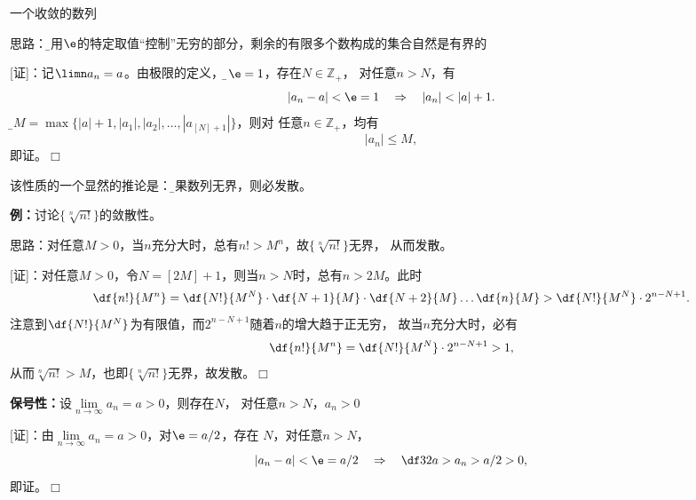 \begin{center}
	
	一个收敛的数列
\end{center}

思路：{\b 利用$\e$的特定取值“控制”无穷的部分，剩余的有限多个数构成的集合自然是有界的}

[证]：记$\limn a_n=a$。由极限的定义，对{\b$\e=1$}，存在$N\in\mathbb{Z}_+$，
对任意$n>N$，有
$$|a_n-a|<\e=1\quad\Rightarrow\quad |a_n|<|a|+1.$$
记{\b$M=\max\{|a|+1,|a_1|,|a_2|,\ldots,|a_{[N]+1}|\}$}，则对
任意$n\in\mathbb{Z}_+$，均有
$$|a_n|\leq M,$$
即证。\hfill $\Box$

该性质的一个显然的推论是：{\b 如果数列无界，则必发散。}

{\bf 例：}讨论$\{\sqrt[n]{n!}\}$的敛散性。

思路：对任意$M>0$，当$n$充分大时，总有$n!>M^n$，故$\{\sqrt[n]{n!}\}$无界，
从而发散。

[证]：对任意$M>0$，令$N=[2M]+1$，则当$n>N$时，总有$n>2M$。此时
$$\df{n!}{M^n}=\df{N!}{M^N}\cdot\df{N+1}{M}
\cdot\df{N+2}{M}\ldots\df{n}{M}>\df{N!}{M^N}\cdot2^{n-N+1}.$$
注意到$\df{N!}{M^N}$为有限值，而$2^{n-N+1}$随着$n$的增大趋于正无穷，
故当$n$充分大时，必有
$$\df{n!}{M^n}=\df{N!}{M^N}\cdot2^{n-N+1}>1,$$
从而$\sqrt[n]{n!}>M$，也即$\{\sqrt[n]{n!}\}$无界，故发散。\hfill $\Box$

\begin{thx}
	{\bf 保号性：}设$\lim\limits_{n\to\infty}a_n=a>0$，则存在$N$，
	对任意$n>N$，$a_n>0$	
\end{thx}

[证]：由$\lim\limits_{n\to\infty}a_n=a>0$，对$\e=a/2$，存在
$N$，对任意$n>N$，
$$|a_n-a|<\e=a/2\quad\Rightarrow\quad \df32a>a_n>a/2>0,$$
即证。\hfill $\Box$
		
